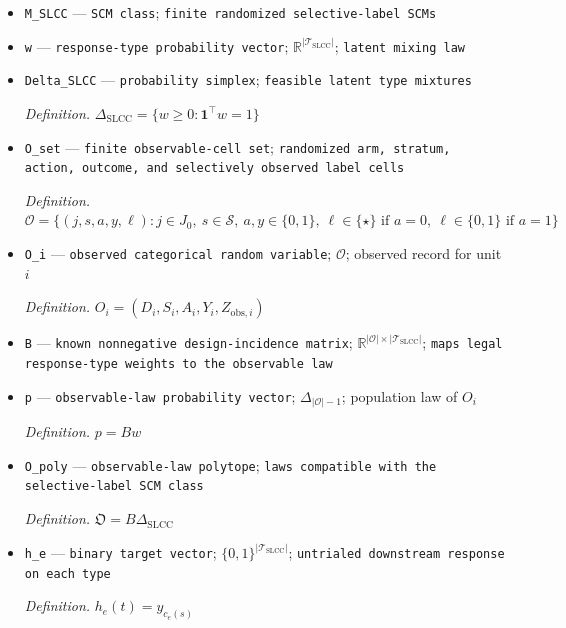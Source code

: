 \documentclass{article}
\begin{document}
\begin{itemize}
  \item \texttt{M\_\allowbreak{}SLCC} --- \texttt{SCM class}; \texttt{finite randomized selective-\allowbreak{}label SCMs}
  \item \texttt{w} --- \texttt{response-\allowbreak{}type probability vector}; \(\mathbb R^{|\mathcal T_{\mathrm{SLCC}}|}\); \texttt{latent mixing law}
  \item \texttt{Delta\_\allowbreak{}SLCC} --- \texttt{probability simplex}; \texttt{feasible latent type mixtures}
  \par\smallskip\noindent\emph{Definition.} \(\Delta_{\mathrm{SLCC}}=\{w\geq0:\mathbf 1^{\top}w=1\}\)
  \item \texttt{O\_\allowbreak{}set} --- \texttt{finite observable-\allowbreak{}cell set}; \texttt{randomized arm,\allowbreak{} stratum,\allowbreak{} action,\allowbreak{} outcome,\allowbreak{} and selectively observed label cells}
  \par\smallskip\noindent\emph{Definition.} \(\mathcal O=\{(j,s,a,y,\ell):j\in J_0,\ s\in\mathcal S,\ a,y\in\{0,1\},\ \ell\in\{\star\}\text{ if }a=0,\ \ell\in\{0,1\}\text{ if }a=1\}\)
  \item \texttt{O\_\allowbreak{}i} --- \texttt{observed categorical random variable}; \(\mathcal O\); observed record for unit \(i\)
  \par\smallskip\noindent\emph{Definition.} \(O_i=(D_i,S_i,A_i,Y_i,Z_{\mathrm{obs},i})\)
  \item \texttt{B} --- \texttt{known nonnegative design-\allowbreak{}incidence matrix}; \(\mathbb R^{|\mathcal O|\times|\mathcal T_{\mathrm{SLCC}}|}\); \texttt{maps legal response-\allowbreak{}type weights to the observable law}
  \item \texttt{p} --- \texttt{observable-\allowbreak{}law probability vector}; \(\Delta_{|\mathcal O|-1}\); population law of \(O_i\)
  \par\smallskip\noindent\emph{Definition.} \(p=Bw\)
  \item \texttt{O\_\allowbreak{}poly} --- \texttt{observable-\allowbreak{}law polytope}; \texttt{laws compatible with the selective-\allowbreak{}label SCM class}
  \par\smallskip\noindent\emph{Definition.} \(\mathfrak O=B\Delta_{\mathrm{SLCC}}\)
  \item \texttt{h\_\allowbreak{}e} --- \texttt{binary target vector}; \(\{0,1\}^{|\mathcal T_{\mathrm{SLCC}}|}\); \texttt{untrialed downstream response on each type}
  \par\smallskip\noindent\emph{Definition.} \(h_e(t)=y_{c_e(s)}\)

\end{itemize}
\end{document}
